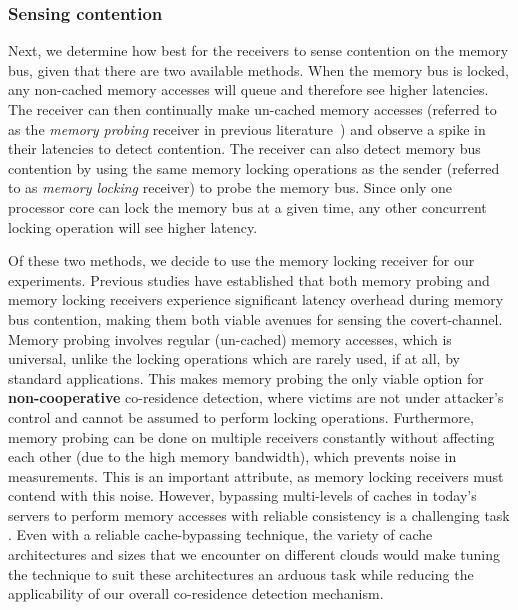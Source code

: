 \subsubsection{Sensing contention} 
Next, we determine how best for the receivers to sense contention on the memory
bus, given that there are two available methods. When the memory bus is locked,
any non-cached memory accesses will queue and therefore see higher latencies.
The receiver can then continually make un-cached memory accesses (referred to as
the \textit{memory probing} receiver in previous
literature~\cite{varadarajan2015}) and observe a spike in their latencies to
detect contention.  The receiver can also detect memory bus contention by using
the same memory locking operations as the sender (referred to as \textit{memory
locking} receiver) to probe the memory bus. Since only one processor core can
lock the memory bus at a given time, any other concurrent locking operation will
see higher latency. 

Of these two methods, we decide to use the memory locking receiver for our experiments. 
Previous studies\cite{wuusenix2012,varadarajan2015} have established that both memory
probing and memory locking receivers experience significant latency overhead
during memory bus contention, making them both viable avenues for sensing the
covert-channel. Memory probing involves regular (un-cached) memory accesses,
which is universal, unlike the locking operations which are rarely used, if at
all, by standard applications. This makes memory probing the only viable option
for \textbf{non-cooperative} co-residence detection, where victims are not under
attacker's control and cannot be assumed to perform locking operations.
Furthermore, memory probing can be done on multiple receivers constantly without
affecting each other (due to the high memory bandwidth), which prevents noise in
measurements. This is an important attribute, as memory locking receivers must
contend with this noise. However, bypassing multi-levels of caches in today's
servers to perform memory accesses with reliable consistency is a challenging
task . Even with a reliable cache-bypassing technique,
the variety of cache architectures and sizes that we encounter on different
clouds would make tuning the technique to suit these architectures an arduous
task while reducing the applicability of our overall co-residence detection
mechanism. 


